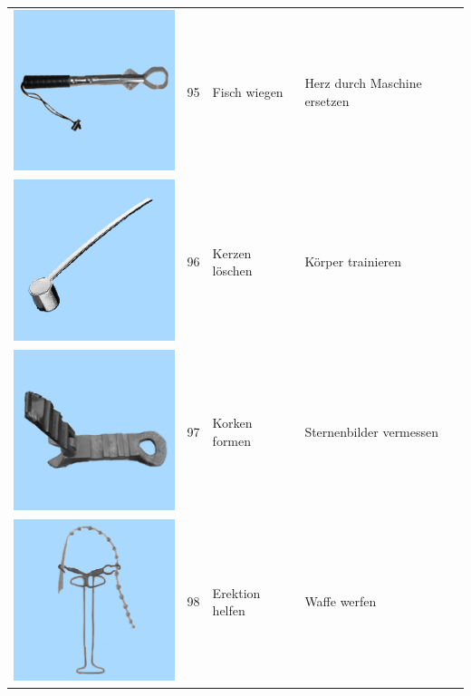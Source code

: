 \documentclass[
  english,
  doc,12pt,twoside,floatsintext]{apa7}
\begin{document}
\begin{center}
\begin{ThreePartTable}
\begin{longtable}{llll}
\includegraphics[valign=c, scale=0.19]{../materials/unfamiliar/95.png} & 95 & Fisch wiegen & Herz durch Maschine ersetzen\\
\includegraphics[valign=c, scale=0.19]{../materials/unfamiliar/96.png} & 96 & Kerzen löschen & Körper trainieren\\
\includegraphics[valign=c, scale=0.19]{../materials/unfamiliar/97.png} & 97 & Korken formen & Sternenbilder vermessen\\
\includegraphics[valign=c, scale=0.19]{../materials/unfamiliar/98.png} & 98 & Erektion helfen & Waffe werfen\\

\end{longtable}
\end{ThreePartTable}
\end{center}
\end{document}
